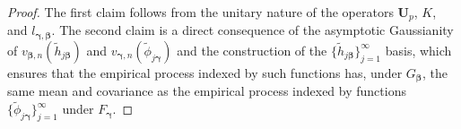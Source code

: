 \documentclass[10pt,a4paper]{amsart}
\newcommand{\thj}{\widetilde{h}_{j\vect{\beta}}}
\newcommand{\tphj}{\widetilde{\phi}_{j\vect{\gamma}}}
\newcommand{\vect}[1]{\boldsymbol{#1}}
\begin{document}
\begin{proof}
The first claim follows from the unitary nature of the operators $\vect{U}_{p}$, $K$, and $l_{\vect{\gamma},\vect{\beta}}$.  
The second claim is a direct consequence of the asymptotic Gaussianity of $v_{\vect{\beta},n}(\thj)$ and $v_{\vect{\gamma},n}(\tphj)$ and the construction of the $\{\thj\}_{j=1}^\infty$ basis, which ensures that the empirical process indexed by such functions has, under $G_{\vect{\beta}}$, the same mean and covariance as the empirical process indexed by functions $\{\tphj\}_{j=1}^\infty$ under $F_{\vect{\gamma}}$.
\end{proof}
\end{document}
